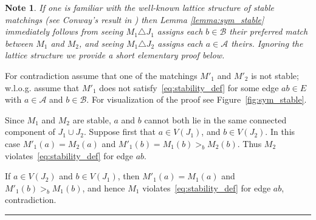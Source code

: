 \documentclass[3p,times]{elsarticle}
\newtheorem{note}[fact]{Note}
\newenvironment{proof}{{\bf Proof:  }}{\hfill\rule{2mm}{2mm}}
\begin{document}
\begin{note}If one is familiar with the well-known lattice structure of stable matchings (see Conway's result in \cite{roth1992two}) then Lemma \ref{lemma:sym_stable} immediately follows from seeing $M_1 \triangle J_1$ assigns each $b \in \mathcal{B}$ their preferred match between $M_1$ and $M_2$, and seeing $M_1 \triangle J_2$ assigns each $a \in \mathcal{A}$ theirs. Ignoring the lattice structure we provide a short elementary proof below.
\end{note}
\begin{proof}
  For contradiction assume
  that one of the matchings $M'_1$ and $M'_2$ is not stable; w.l.o.g. assume that
  $M'_1$ does not satisfy~\eqref{eq:stability_def} for some edge
  $ab\in E$ with $a\in\mathcal{A}$ and $b\in\mathcal{B}$. For visualization of the proof see Figure~\ref{fig:sym_stable}.

  Since $M_1$ and $M_2$ are stable, $a$ and $b$ cannot both lie in the
  same connected component of $J_1 \cup J_2$. Suppose first that $a \in
  V(J_1)$, and $b \in V(J_2)$. In this case $M'_1(a)=M_2(a)$ and
  $M'_1(b) = M_1(b) >_b M_2(b)$. Thus $M_2$
  violates~\eqref{eq:stability_def} for edge $ab$. 

  If $a\in V(J_2)$
  and $b\in V(J_1)$, then $M'_1(a)=M_1(a)$ and $M'_1(b)>_b M_1(b)$,
  and hence $M_1$ violates~\eqref{eq:stability_def} for edge $ab$,
  contradiction.
\end{proof}
\end{document}
